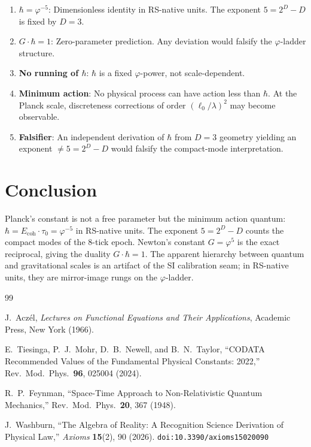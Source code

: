 \documentclass[12pt,a4paper]{article}
\theoremstyle{definition}
\theoremstyle{remark}
\begin{document}
\begin{enumerate}
  \item \textbf{$\hbar = \varphi^{-5}$}: Dimensionless identity
  in RS-native units.  The exponent $5 = 2^D - D$ is fixed by
  $D = 3$.

  \item \textbf{$G \cdot \hbar = 1$}: Zero-parameter prediction.
  Any deviation would falsify the $\varphi$-ladder structure.

  \item \textbf{No running of $\hbar$}: $\hbar$ is a fixed
  $\varphi$-power, not scale-dependent.

  \item \textbf{Minimum action}: No physical process can have
  action less than $\hbar$.  At the Planck scale, discreteness
  corrections of order $(\ell_0/\lambda)^2$ may become
  observable.

  \item \textbf{Falsifier}: An independent derivation of
  $\hbar$ from $D = 3$ geometry yielding an exponent
  $\neq 5 = 2^D - D$ would falsify the compact-mode
  interpretation.
\end{enumerate}

\section{Conclusion}
\label{sec:conclusion}

Planck's constant is not a free parameter but the minimum action
quantum: $\hbar = E_{\mathrm{coh}} \cdot \tau_0 = \varphi^{-5}$
in RS-native units.  The exponent $5 = 2^D - D$ counts the
compact modes of the 8-tick epoch.  Newton's constant
$G = \varphi^5$ is the exact reciprocal, giving the duality
$G \cdot \hbar = 1$.  The apparent hierarchy between quantum
and gravitational scales is an artifact of the SI calibration
seam; in RS-native units, they are mirror-image rungs on the
$\varphi$-ladder.

\begin{thebibliography}{99}

J.~Acz\'el, \emph{Lectures on Functional Equations and Their Applications},
Academic Press, New York (1966).

E.~Tiesinga, P.~J.~Mohr, D.~B.~Newell, and B.~N.~Taylor,
``CODATA Recommended Values of the Fundamental Physical
Constants: 2022,'' Rev.\ Mod.\ Phys.\ \textbf{96}, 025004
(2024).

R.~P.~Feynman, ``Space-Time Approach to Non-Relativistic
Quantum Mechanics,'' Rev.\ Mod.\ Phys.\ \textbf{20}, 367
(1948).

J.~Washburn, ``The Algebra of Reality: A Recognition Science Derivation
of Physical Law,'' \emph{Axioms} \textbf{15}(2), 90 (2026).
\texttt{doi:10.3390/axioms15020090}

\end{thebibliography}
\end{document}
